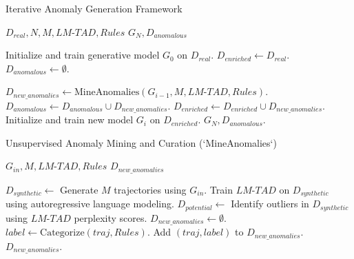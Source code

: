 \begin{algorithm}[h!]
  \caption{Iterative Anomaly Generation Framework}\label{alg:iterative-generation}
  \begin{algorithmic}[1]
    \Require $D_{real}, N, M, LM\text{-}TAD, Rules$
    \Ensure $G_N, D_{anomalous}$

    \State Initialize and train generative model $G_0$ on $D_{real}$.
    \State $D_{enriched} \gets D_{real}$.
    \State $D_{anomalous} \gets \emptyset$.

    \State $D_{new\_anomalies} \gets \text{MineAnomalies}(G_{i-1}, M, LM\text{-}TAD, Rules)$.
    \State $D_{anomalous} \gets D_{anomalous} \cup D_{new\_anomalies}$.
    \State $D_{enriched} \gets D_{enriched} \cup D_{new\_anomalies}$.
    \State Initialize and train new model $G_i$ on $D_{enriched}$.
    \EndFor
    \State \Return $G_N, D_{anomalous}$.
  \end{algorithmic}
\end{algorithm}

\begin{algorithm}[h!]
  \caption{Unsupervised Anomaly Mining and Curation (`MineAnomalies`)}\label{alg:anomaly-mining}
  \begin{algorithmic}[1]
    \Require $G_{in}, M, LM\text{-}TAD, Rules$
    \Ensure $D_{new\_anomalies}$

    \State $D_{synthetic} \gets$ Generate $M$ trajectories using $G_{in}$.
    \State Train $LM\text{-}TAD$ on $D_{synthetic}$ using autoregressive language modeling.
    \State $D_{potential} \gets$ Identify outliers in $D_{synthetic}$ using $LM\text{-}TAD$ perplexity scores.
    \State $D_{new\_anomalies} \gets \emptyset$.
    \State $label \gets \text{Categorize}(traj, Rules)$.
    \State Add $(traj, label)$ to $D_{new\_anomalies}$.
    \EndIf
    \EndFor
    \State \Return $D_{new\_anomalies}$.
  \end{algorithmic}
\end{algorithm}

